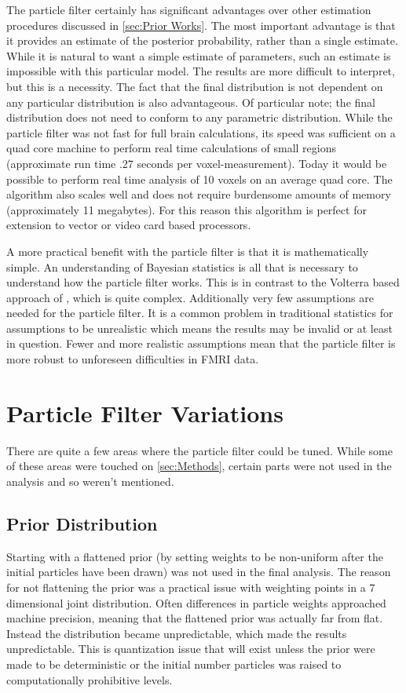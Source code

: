 The particle filter certainly has significant advantages over other estimation procedures
discussed in \autoref{sec:Prior Works}. The most important advantage is that it provides
an estimate of the posterior probability, rather than a single estimate. While it is natural
to want a simple estimate of parameters, such an estimate is impossible with this particular
model. The results are more difficult to interpret, but this is a necessity. The fact that 
the final distribution is not dependent on any particular distribution is also advantageous.
Of particular note; the final distribution does not need to conform to any parametric
distribution. While the particle filter was not fast for full brain calculations, its speed
was sufficient on a quad core machine to perform real time calculations of small regions
(approximate run time .27 seconds per voxel-measurement). Today it would be possible
 to perform real time analysis of 10 voxels on an average quad core. The algorithm also scales
well and does not require burdensome amounts of memory (approximately 11 megabytes). 
For this reason this algorithm is perfect for extension to vector or video card
based processors. 

A more practical benefit with the particle filter is that it is mathematically
simple. An understanding of Bayesian statistics is all that is necessary to understand
how the particle filter works. This is in contrast to the Volterra based approach
of \cite{Friston2000}, which is quite complex. Additionally very few assumptions
are needed for the particle filter. It is a common problem in traditional statistics 
for assumptions to be unrealistic which means the results may be invalid or at 
least in question. 
Fewer and more realistic assumptions mean that the particle filter is more robust
to unforeseen difficulties in FMRI data. 

\section{Particle Filter Variations}
There are quite a few areas where the particle filter could be tuned. While
some of these areas were touched on \autoref{sec:Methods}, certain parts were
not used in the analysis and so weren't mentioned. 

\subsection{Prior Distribution}
Starting with a flattened
prior (by setting weights to be non-uniform after the initial particles have
been drawn) was not used in the final analysis. The reason for not flattening
the prior was a practical issue with weighting points in a 
7 dimensional joint distribution. Often differences in particle weights approached machine 
precision, meaning that the flattened prior was actually far from flat. Instead
the distribution became unpredictable, which made the results unpredictable. This
is quantization issue that will exist unless the prior were made to be deterministic
or the initial number particles was raised to computationally prohibitive levels.


